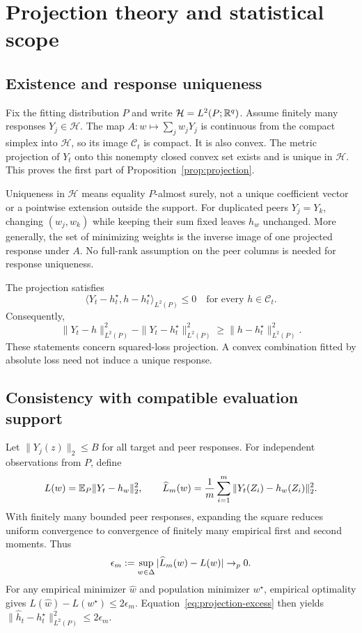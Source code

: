 \section{Projection theory and statistical scope}
\label{app:theory}

\subsection{Existence and response uniqueness}
Fix the fitting distribution $P$ and write $\mathcal H=L^2(P;\mathbb{R}^q)$. Assume finitely many responses $Y_j\in\mathcal H$. The map $A:w\mapsto\sum_jw_jY_j$ is continuous from the compact simplex into $\mathcal H$, so its image $\mathcal C_t$ is compact. It is also convex. The metric projection of $Y_t$ onto this nonempty closed convex set exists and is unique in $\mathcal H$. This proves the first part of Proposition~\ref{prop:projection}.

Uniqueness in $\mathcal H$ means equality $P$-almost surely, not a unique coefficient vector or a pointwise extension outside the support. For duplicated peers $Y_j=Y_k$, changing $(w_j,w_k)$ while keeping their sum fixed leaves $h_w$ unchanged. More generally, the set of minimizing weights is the inverse image of one projected response under $A$. No full-rank assumption on the peer columns is needed for response uniqueness.

The projection satisfies
\begin{equation}
\langle Y_t-h_t^\star,h-h_t^\star\rangle_{L^2(P)}\leq0
\quad\text{for every }h\in\mathcal C_t.
\end{equation}
Consequently,
\begin{equation}
\|Y_t-h\|_{L^2(P)}^2-\|Y_t-h_t^\star\|_{L^2(P)}^2
\geq \|h-h_t^\star\|_{L^2(P)}^2.
\label{eq:projection-excess}
\end{equation}
These statements concern squared-loss projection. A convex combination fitted by absolute loss need not induce a unique response.

\subsection{Consistency with compatible evaluation support}
Let $\|Y_j(z)\|_2\leq B$ for all target and peer responses. For independent observations from $P$, define
\begin{equation}
L(w)=\mathbb{E}_P\|Y_t-h_w\|_2^2,\qquad
\widehat L_m(w)=\frac1m\sum_{i=1}^m\|Y_t(Z_i)-h_w(Z_i)\|_2^2.
\end{equation}
With finitely many bounded peer responses, expanding the square reduces uniform convergence to convergence of finitely many empirical first and second moments. Thus
\begin{equation}
\epsilon_m:=\sup_{w\in\Delta}|\widehat L_m(w)-L(w)|\to_p0.
\end{equation}
For any empirical minimizer $\widehat w$ and population minimizer $w^\star$, empirical optimality gives $L(\widehat w)-L(w^\star)\leq2\epsilon_m$. Equation~\eqref{eq:projection-excess} then yields
$\|\widehat h_t-h_t^\star\|_{L^2(P)}^2\leq2\epsilon_m$.

